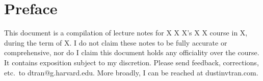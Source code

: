 \documentclass{lecture}
\date{X}
\begin{document}

\frontmatter
\maketitle
\begingroup
\let\cleardoublepage\clearpage
\tableofcontents

\chapter*{Preface}
This document is a compilation of lecture notes for X X X's X X course in X,
during the term of X.  I do not claim these notes to be fully accurate or
comprehensive, nor do I claim this document holds any officiality over
the course. It contains exposition subject to my discretion. Please send
feedback, corrections, etc.\ to {dtran@g.harvard.edu}.  More broadly, I can be
reached at {dustinvtran.com}.

\mainmatter
\endgroup

%
%

\end{document}
